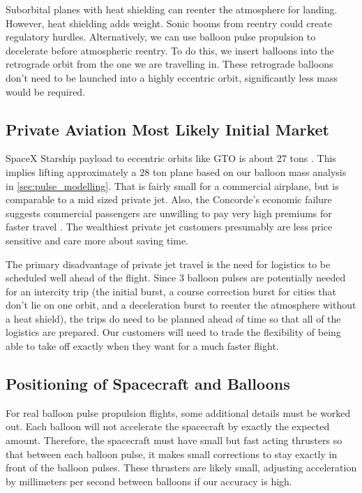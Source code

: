 \documentclass{article}
\begin{document}
Suborbital planes with heat shielding can reenter the atmosphere for landing.   However, heat shielding adds weight.   Sonic booms from reentry could create regulatory hurdles.   Alternatively, we can use balloon pulse propulsion to decelerate before atmospheric reentry.   To do this, we insert balloons into the retrograde orbit from the one we are travelling in.   These retrograde balloons don't need to be launched into a highly eccentric orbit, significantly less mass would be required.

\subsection{Private Aviation Most Likely Initial Market}
SpaceX Starship payload to eccentric orbits like GTO is about 27 tons \cite{spacex_user_guide}.   This implies lifting approximately a 28 ton plane based on our balloon mass analysis in \autoref{sec:pulse_modelling}.   That is fairly small for a commercial airplane, but is comparable to a mid sized private jet.   Also, the Concorde's economic failure suggests commercial passengers are unwilling to pay very high premiums for faster travel \cite{concorde_expensive}.  The wealthiest private jet customers presumably are less price sensitive and care more about saving time.    

The primary disadvantage of private jet travel is the need for logistics to be scheduled well ahead of the flight.   Since 3 balloon pulses are potentially needed for an intercity trip (the initial burst, a course correction burst for cities that don't lie on one orbit, and a deceleration burst to reenter the atmosphere without a heat shield), the trips do need to be planned ahead of time so that all of the logistics are prepared.   Our customers will need to trade the flexibility of being able to take off exactly when they want for a much faster flight.   

\subsection{Positioning of Spacecraft and Balloons}\label{sec:balloon_positioning}
For real balloon pulse propulsion flights, some additional details must be worked out.   Each balloon will not accelerate the spacecraft by exactly the expected amount.   Therefore, the spacecraft must have small but fast acting thrusters so that between each balloon pulse, it makes small corrections to stay exactly in front of the balloon pulses.    These thrusters are likely small, adjusting acceleration by millimeters per second between balloons if our accuracy is high.
\end{document}
